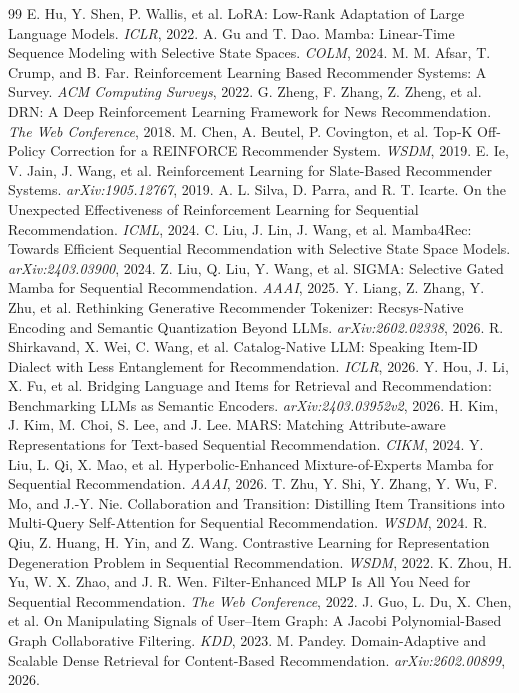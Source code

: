 \documentclass[11pt,a4paper]{article}
\begin{document}
\begin{thebibliography}{99}
 E. Hu, Y. Shen, P. Wallis, et al. LoRA: Low-Rank Adaptation of Large Language Models. \emph{ICLR}, 2022.
 A. Gu and T. Dao. Mamba: Linear-Time Sequence Modeling with Selective State Spaces. \emph{COLM}, 2024.
 M. M. Afsar, T. Crump, and B. Far. Reinforcement Learning Based Recommender Systems: A Survey. \emph{ACM Computing Surveys}, 2022.
 G. Zheng, F. Zhang, Z. Zheng, et al. DRN: A Deep Reinforcement Learning Framework for News Recommendation. \emph{The Web Conference}, 2018.
 M. Chen, A. Beutel, P. Covington, et al. Top-K Off-Policy Correction for a REINFORCE Recommender System. \emph{WSDM}, 2019.
 E. Ie, V. Jain, J. Wang, et al. Reinforcement Learning for Slate-Based Recommender Systems. \emph{arXiv:1905.12767}, 2019.
 A. L. Silva, D. Parra, and R. T. Icarte. On the Unexpected Effectiveness of Reinforcement Learning for Sequential Recommendation. \emph{ICML}, 2024.
 C. Liu, J. Lin, J. Wang, et al. Mamba4Rec: Towards Efficient Sequential Recommendation with Selective State Space Models. \emph{arXiv:2403.03900}, 2024.
 Z. Liu, Q. Liu, Y. Wang, et al. SIGMA: Selective Gated Mamba for Sequential Recommendation. \emph{AAAI}, 2025.
 Y. Liang, Z. Zhang, Y. Zhu, et al. Rethinking Generative Recommender Tokenizer: Recsys-Native Encoding and Semantic Quantization Beyond LLMs. \emph{arXiv:2602.02338}, 2026.
 R. Shirkavand, X. Wei, C. Wang, et al. Catalog-Native LLM: Speaking Item-ID Dialect with Less Entanglement for Recommendation. \emph{ICLR}, 2026.
 Y. Hou, J. Li, X. Fu, et al. Bridging Language and Items for Retrieval and Recommendation: Benchmarking LLMs as Semantic Encoders. \emph{arXiv:2403.03952v2}, 2026.
 H. Kim, J. Kim, M. Choi, S. Lee, and J. Lee. MARS: Matching Attribute-aware Representations for Text-based Sequential Recommendation. \emph{CIKM}, 2024.
 Y. Liu, L. Qi, X. Mao, et al. Hyperbolic-Enhanced Mixture-of-Experts Mamba for Sequential Recommendation. \emph{AAAI}, 2026.
 T. Zhu, Y. Shi, Y. Zhang, Y. Wu, F. Mo, and J.-Y. Nie. Collaboration and Transition: Distilling Item Transitions into Multi-Query Self-Attention for Sequential Recommendation. \emph{WSDM}, 2024.
 R. Qiu, Z. Huang, H. Yin, and Z. Wang. Contrastive Learning for Representation Degeneration Problem in Sequential Recommendation. \emph{WSDM}, 2022.
 K. Zhou, H. Yu, W. X. Zhao, and J. R. Wen. Filter-Enhanced MLP Is All You Need for Sequential Recommendation. \emph{The Web Conference}, 2022.
 J. Guo, L. Du, X. Chen, et al. On Manipulating Signals of User--Item Graph: A Jacobi Polynomial-Based Graph Collaborative Filtering. \emph{KDD}, 2023.
 M. Pandey. Domain-Adaptive and Scalable Dense Retrieval for Content-Based Recommendation. \emph{arXiv:2602.00899}, 2026.
\end{thebibliography}
\end{document}

